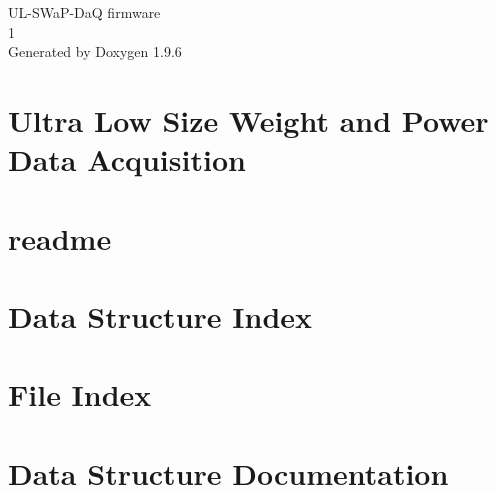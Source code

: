 \documentclass[twoside]{book}
\newcommand{\+}{\discretionary{\mbox{\scriptsize$\hookleftarrow$}}{}{}}
\newcommand{\clearemptydoublepage}{%
    \newpage{\pagestyle{empty}\cleardoublepage}%
  }
\begin{document}
  \raggedbottom
  \begin{titlepage}
  \vspace*{7cm}
  \begin{center}%
  {\Large UL-\/\+SWa\+P-\/\+Da\+Q firmware}\\
  [1ex]\large 1 \\
  \vspace*{1cm}
  {\large Generated by Doxygen 1.9.6}\\
  \end{center}
  \end{titlepage}
  \clearemptydoublepage
  \tableofcontents
  \clearemptydoublepage
\chapter{Ultra Low Size Weight and Power Data Acquisition}
\label{index}
\chapter{readme}
\label{md_firmware_src_readme}

\chapter{Data Structure Index}

\chapter{File Index}

\chapter{Data Structure Documentation}







\end{document}
